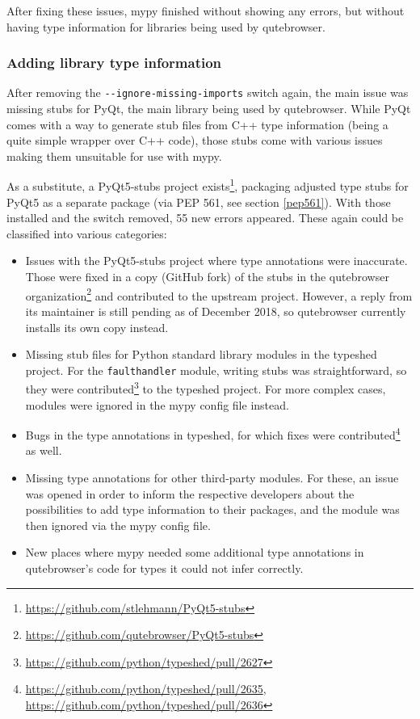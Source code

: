 After fixing these issues, mypy finished without showing any errors, but without
having type information for libraries being used by qutebrowser.

\subsubsection{Adding library type information}

After removing the \verb|--ignore-missing-imports| switch again, the main issue
was missing stubs for PyQt, the main library being used by qutebrowser. While
PyQt comes with a way to generate stub files from C++ type information (being a
quite simple wrapper over C++ code), those stubs come with various issues making
them unsuitable for use with mypy.

As a substitute, a PyQt5-stubs project
exists\footnote{\url{https://github.com/stlehmann/PyQt5-stubs}}, packaging
adjusted type stubs for PyQt5 as a separate package (via PEP 561, see
section \ref{pep561}). With those installed and the switch removed, 55 new errors
appeared. These again could be classified into various categories:

\begin{itemize}
  \item Issues with the PyQt5-stubs project where type annotations were
    inaccurate. Those were fixed in a copy (GitHub fork) of the stubs in the
    qutebrowser
    organization\footnote{\url{https://github.com/qutebrowser/PyQt5-stubs}} and
    contributed to the upstream project. However, a reply from its maintainer is
    still pending as of December 2018, so qutebrowser currently installs its own
    copy instead.
  \item Missing stub files for Python standard library modules in the typeshed
    project. For the \verb|faulthandler| module, writing stubs was
    straightforward, so they were
    contributed\footnote{\url{https://github.com/python/typeshed/pull/2627}} to
    the typeshed project. For more complex cases, modules were ignored in
    the mypy config file instead.
  \item Bugs in the type annotations in typeshed, for which fixes were
    contributed\footnote{\url{https://github.com/python/typeshed/pull/2635}, \\
      \url{https://github.com/python/typeshed/pull/2636}} as well.
  \item Missing type annotations for other third-party modules. For these, an
    issue was opened in order to inform the respective developers about the
    possibilities to add type information to their packages, and the module was
    then ignored via the mypy config file.
  \item New places where mypy needed some additional type annotations in
    qutebrowser's code for types it could not infer correctly.
\end{itemize}

